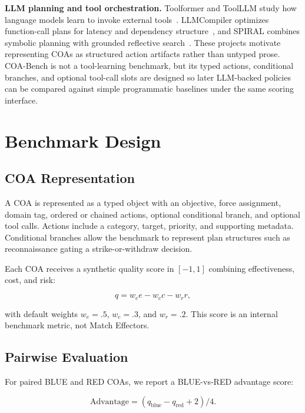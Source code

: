 \documentclass[sigconf]{acmart}
\begin{document}
\textbf{LLM planning and tool orchestration.} Toolformer and ToolLLM study how language models learn to invoke external tools~\cite{schick2023toolformer,qin2024toolllm}. LLMCompiler optimizes function-call plans for latency and dependency structure~\cite{kim2024llmcompiler}, and SPIRAL combines symbolic planning with grounded reflective search~\cite{zhang2026spiral}. These projects motivate representing COAs as structured action artifacts rather than untyped prose. COA-Bench is not a tool-learning benchmark, but its typed actions, conditional branches, and optional tool-call slots are designed so later LLM-backed policies can be compared against simple programmatic baselines under the same scoring interface.

\section{Benchmark Design}

\subsection{COA Representation}

A COA is represented as a typed object with an objective, force assignment, domain tag, ordered or chained actions, optional conditional branch, and optional tool calls. Actions include a category, target, priority, and supporting metadata. Conditional branches allow the benchmark to represent plan structures such as reconnaissance gating a strike-or-withdraw decision.

Each COA receives a synthetic quality score in $[-1,1]$ combining effectiveness, cost, and risk:

\begin{equation}
q = w_e e - w_c c - w_r r,
\end{equation}

with default weights $w_e=.5$, $w_c=.3$, and $w_r=.2$. This score is an internal benchmark metric, not Match Effectors.

\subsection{Pairwise Evaluation}

For paired BLUE and RED COAs, we report a BLUE-vs-RED advantage score:

\begin{equation}
\mathrm{Advantage} = (q_{\mathrm{blue}} - q_{\mathrm{red}} + 2) / 4.
\end{equation}
\end{document}
